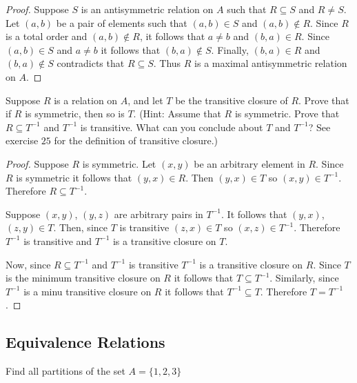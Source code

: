 \begin{proof}
    Suppose $S$ is an antisymmetric relation on $A$ such that 
        $R \subseteq S$ and $R \not = S$.
    Let $(a, b)$ be a pair of elements such that $(a, b) \in S$
        and $(a, b) \not \in R$.
    Since $R$ is a total order and $(a,b) \notin R$, it follows that $a \not = b$
        and $(b, a) \in R$.
    Since $(a, b) \in S$ and $a \not = b$ it follows that $(b, a) \not \in S$.
    Finally, $(b, a) \in R$ and $(b, a) \not \in S$ contradicts that $R \subseteq S$.
    Thus $R$ is a maximal antisymmetric relation on $A$.
\end{proof}

\newpage
\begin{tcolorbox}[title=Problem 30, breakable]
    Suppose $R$ is a relation on $A$, and let $T$ be the transitive closure of $R$.
    Prove that if $R$ is symmetric, then so is $T$. (Hint: Assume that $R$ is symmetric.
    Prove that $R \subseteq T^{-1}$ and $T^{-1}$ is transitive. What can you conclude 
    about $T$ and $T^{-1}$? See exercise $25$ for the definition of transitive closure.)
\end{tcolorbox}

\begin{proof}
    Suppose $R$ is symmetric. Let $(x, y)$ be an arbitrary element in $R$.
    Since $R$ is symmetric it follows that $(y, x) \in R$.
    Then $(y, x) \in T$ so $(x, y) \in T^{-1}$.
    Therefore $R \subseteq T^{-1}$.

    Suppose $(x, y)$, $(y, z)$ are arbitrary pairs in $T^{-1}$.
    It follows that $(y, x)$, $(z, y) \in T$.
    Then, since $T$ is transitive $(z, x) \in T$ so $(x, z) \in T^{-1}$.
    Therefore $T^{-1}$ is transitive and $T^{-1}$ is a transitive
        closure on $T$.

    Now, since $R \subseteq T^{-1}$ and $T^{-1}$ is transitive $T^{-1}$ is
        a transitive closure on $R$.
    Since $T$ is the minimum transitive closure 
        on $R$ it follows that $T \subseteq T^{-1}$.
    Similarly, since $T^{-1}$ is a minu transitive closure 
        on $R$ it follows that $T^{-1} \subseteq T$.
    Therefore $T = T^{-1}$.
\end{proof}

\subsection{Equivalence Relations}

\begin{tcolorbox}[title=Problem 1, breakable]
    Find all partitions of the set $A = \{1, 2, 3\}$
\end{tcolorbox}

